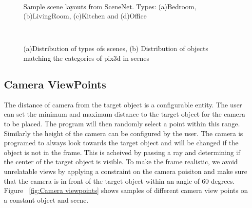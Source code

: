 \begin{figure}[!ht]
    \centering
    \quad
    \\
    \quad
    \caption{Sample scene layouts from SceneNet. Types: (a)Bedroom, (b)LivingRoom, (c)Kitchen and (d)Office}
    \label{fig:Scene Types}
\end{figure}

\begin{figure}[!ht]
    \centering
    \quad
    \\
    \caption{(a)Distribution of types ofs scenes, (b) Distribution of objects matching the categories of pix3d in scenes}
    \label{fig:distribution of scenes}
\end{figure}

\subsection{Camera ViewPoints}

The distance of camera from the target object is a configurable entity.
The user can set the minimum and maximum distance to the target object for the camera to be placed.
The program will then randomly select a point within this range.
Similarly the height of the camera can be configured by the user.
The camera is programed to always look towards the target object and will be changed if the object is not in the frame.
This is acheived by passing a ray and determining if the center of the target object is visible.
To make the frame realistic, we avoid unrelatable views by applying a constraint on the camera poisiton and make sure that the camera is in front of the target object within an angle of 60 degrees.
Figure ~\ref{fig:Camera viewpoints} shows samples of different camera view points on a constant object and scene.

